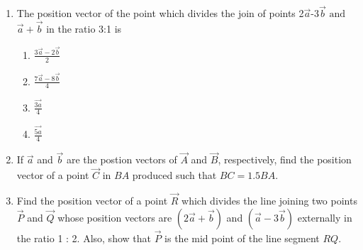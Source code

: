 \begin{enumerate}[label=\thesubsection.\arabic*,ref=\thesubsection.\theenumi]
\item The position vector of the point which divides the join of points 2$\vec{a}$-3$\vec{b}$ $\text{and}$ $\vec{a}+\vec{b}$ in the ratio 3:1 is
	\begin{enumerate}
\item $\frac{3\vec{a}-2\vec{b}}{2}$
\item $\frac{7\vec{a}-8\vec{b}}{4}$
\item $\frac{\vec{3a}}{4}$
\item $\frac{\vec{5a}}{4}$
\end{enumerate}
\item If $\vec{a}$ and $\vec{b}$ are the postion vectors of $\vec{A}$ and $\vec{B}$, respectively, find the position vector of a point $\vec{C}$ in $BA$ produced such that $BC=1.5BA$.
\item Find the position vector of a point $\vec{R}$ which divides the line joining two points $\vec{P}$ and $\vec{Q}$ whose position vectors are $(2\vec{a}+\vec{b})$ and $(\vec{a}-3\vec{b})$
externally in the ratio 1 : 2. Also, show that $\vec{P}$ is the mid point of the line segment $RQ$.
\end{enumerate}
